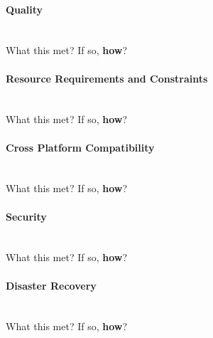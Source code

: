 \paragraph{Quality}\ \\
{\color{red} What this met? If so, \textbf{how}?}

\paragraph{Resource Requirements and Constraints}\ \\
{\color{red} What this met? If so, \textbf{how}?}

\paragraph{Cross Platform Compatibility}\ \\
{\color{red} What this met? If so, \textbf{how}?}

\paragraph{Security}\ \\
{\color{red} What this met? If so, \textbf{how}?}

\paragraph{Disaster Recovery}\ \\
{\color{red} What this met? If so, \textbf{how}?}

